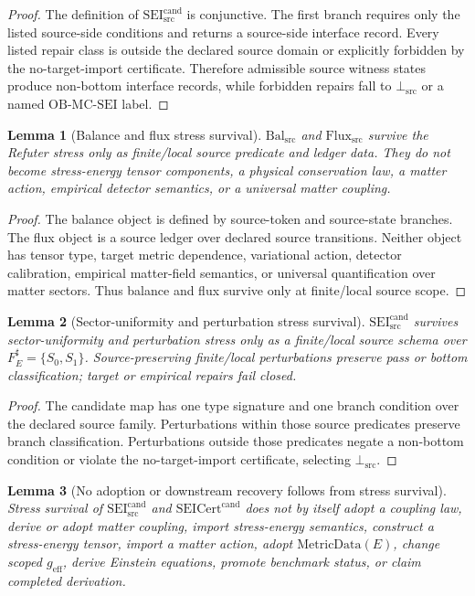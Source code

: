 \documentclass[11pt]{article}
\newcommand{\MetricData}{\mathrm{MetricData}}
\newcommand{\geff}{g_{\mathrm{eff}}}
\newcommand{\SEICand}{\mathrm{SEI}_{\mathrm{src}}^{\mathrm{cand}}}
\newcommand{\SEICertCand}{\mathrm{SEICert}^{\mathrm{cand}}}
\newcommand{\BalSrc}{\mathrm{Bal}_{\mathrm{src}}}
\newcommand{\FluxSrc}{\mathrm{Flux}_{\mathrm{src}}}
\newcommand{\BottomSrc}{\bot_{\mathrm{src}}}
\newcommand{\OBMCSEI}{\mathrm{OB}\mbox{-}\mathrm{MC}\mbox{-}\mathrm{SEI}}
\newtheorem{lemma}{Lemma}
\begin{document}
\begin{proof}
The definition of \(\SEICand\) is conjunctive. The first branch requires only
the listed source-side conditions and returns a source-side interface record.
Every listed repair class is outside the declared source domain or explicitly
forbidden by the no-target-import certificate. Therefore admissible source
witness states produce non-bottom interface records, while forbidden repairs
fall to \(\BottomSrc\) or a named \(\OBMCSEI\) label.
\end{proof}

\begin{lemma}[Balance and flux stress survival]
\(\BalSrc\) and \(\FluxSrc\) survive the Refuter stress only as finite/local
source predicate and ledger data. They do not become stress-energy tensor
components, a physical conservation law, a matter action, empirical detector
semantics, or a universal matter coupling.
\end{lemma}

\begin{proof}
The balance object is defined by source-token and source-state branches. The
flux object is a source ledger over declared source transitions. Neither
object has tensor type, target metric dependence, variational action, detector
calibration, empirical matter-field semantics, or universal quantification
over matter sectors. Thus balance and flux survive only at finite/local
source scope.
\end{proof}

\begin{lemma}[Sector-uniformity and perturbation stress survival]
\(\SEICand\) survives sector-uniformity and perturbation stress only as a
finite/local source schema over \(F_E^\sharp=\{S_0,S_1\}\). Source-preserving
finite/local perturbations preserve pass or bottom classification; target or
empirical repairs fail closed.
\end{lemma}

\begin{proof}
The candidate map has one type signature and one branch condition over the
declared source family. Perturbations within those source predicates preserve
branch classification. Perturbations outside those predicates negate a
non-bottom condition or violate the no-target-import certificate, selecting
\(\BottomSrc\).
\end{proof}

\begin{lemma}[No adoption or downstream recovery follows from stress survival]
Stress survival of \(\SEICand\) and \(\SEICertCand\) does not by itself adopt
a coupling law, derive or adopt matter coupling, import stress-energy
semantics, construct a stress-energy tensor, import a matter action, adopt
\(\MetricData(E)\), change scoped \(\geff\), derive Einstein equations,
promote benchmark status, or claim completed derivation.
\end{lemma}
\end{document}
